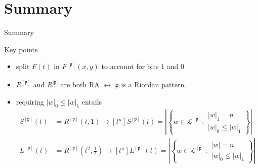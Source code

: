 \documentclass{beamer}
\begin{document}
\section*{Summary}

\begin{frame}{Summary}

  \begin{block}{Key points}
      \begin{itemize}
      \item split $F(t)$ in $F^{[\mathfrak{p}]}(x,y)$ to account for bits $1$ and $0$
      \item ${{R}^{[\mathfrak{p}]}}$ and ${{R}^{[\bar{\mathfrak{p}]}}}$ are both RA
      $\leftrightarrow$  $\mathfrak{p}$ is a Riordan pattern.
      \item requiring $|w|_{0}\leq|w|_{1}$ entails
          \begin{displaymath}
          \begin{split}
          S^{[\mathfrak{p}]}(t)&=R^{[\mathfrak{p}]}(t,1)\rightarrow 
            [t^{n}]S^{[\mathfrak{p}]}(t)= \left|\left\lbrace w \in  \mathcal{L}^{[\mathfrak{p}]}:
                \begin{array}{l} |w|_{1} = n \\ |w|_{0}\leq|w|_{1} \end{array}\right\rbrace\right|\\
          L^{[\mathfrak{p}]}(t)&=R^{[\mathfrak{p}]}\left(t^2,\frac{1}{t}\right)\rightarrow
            [t^{n}]L^{[\mathfrak{p}]}(t)= \left|\left\lbrace w \in  \mathcal{L}^{[\mathfrak{p}]}:
                \begin{array}{l} |w| = n \\ |w|_{0}\leq|w|_{1} \end{array}\right\rbrace\right|\\
          \end{split}
          \end{displaymath}
      \end{itemize}
  \end{block}
\end{frame}
  

\begin{frame}{ }
\Huge \smiley
\end{frame}
\end{document}
